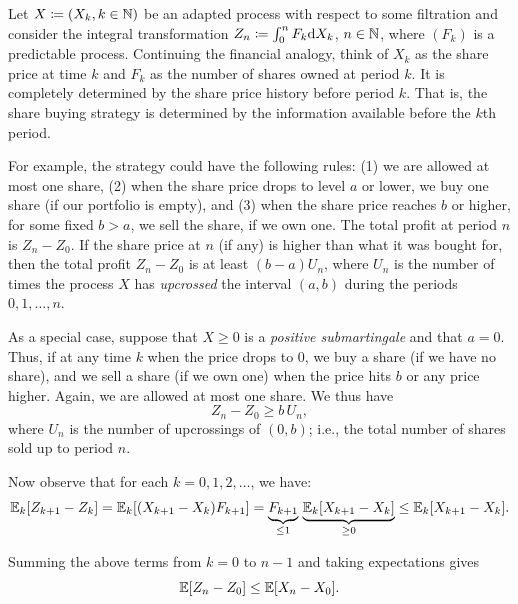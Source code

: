 Let \(X \coloneqq (X_k, k \in \mathbb{N})\) be an adapted process with respect to some filtration and consider the integral transformation \(Z_n \coloneqq \int_0^n F_k \mathrm{d} X_k\), \(n \in \mathbb{N}\), where \((F_k)\) is a predictable process. Continuing the financial analogy, think of \(X_k\) as the share price at time \(k\) and \(F_k\) as the number of shares owned at period \(k\). It is completely determined by the share price history before period \(k\). That is, the share buying strategy is determined by the information available before the \(k\)th period.

For example, the strategy could have the following rules: (1) we are allowed at most one share, (2) when the share price drops to level \(a\) or lower, we buy one share (if our portfolio is empty), and (3) when the share price reaches \(b\) or higher, for some fixed \(b > a\), we sell the share, if we own one.
The total profit at period \(n\) is \(Z_n - Z_0\).
If the share price at \(n\) (if any) is higher than what it was bought for, then the total profit \(Z_n - Z_0\) is at least \((b - a) U_n\), where \(U_n\) is the number of times the process \(X\) has \textit{upcrossed} the interval \((a, b)\) during the periods \(0, 1, \ldots, n\).

As a special case, suppose that \(X \ge 0\) is a \textit{positive submartingale} and that \(a = 0\). Thus, if at any time \(k\) when the price drops to \(0\), we buy a share (if we have no share), and we sell a share (if we own one) when the price hits \(b\) or any price higher. Again, we are allowed at most one share. We thus have
\begin{equation}\label{eq:SpecialCaseUpcrossingProfit}
	Z_n - Z_0 \ge b \, U_n,
\end{equation}
where \(U_n\) is the number of upcrossings of \((0, b)\); i.e., the total number of shares sold up to period \(n\).

Now observe that for each \(k = 0, 1, 2, \ldots\), we have:
\begin{equation}\label{eq:PredictableIncrementBound}
	\mathbb{E}_k[Z_{k+1} - Z_k]
	= \mathbb{E}_k[(X_{k+1} - X_k) F_{k+1}]
	= \underbrace{F_{k+1}}_{\le 1} \, \underbrace{\mathbb{E}_k[X_{k+1} - X_k]}_{\ge 0}
	\le \mathbb{E}_k[X_{k+1} - X_k].
\end{equation}

Summing the above terms from \(k = 0\) to \(n - 1\) and taking expectations gives
\begin{equation}\label{eq:ExpectedIncrementBound}
	\mathbb{E}[Z_n - Z_0] \le \mathbb{E}[X_n - X_0].
\end{equation}

